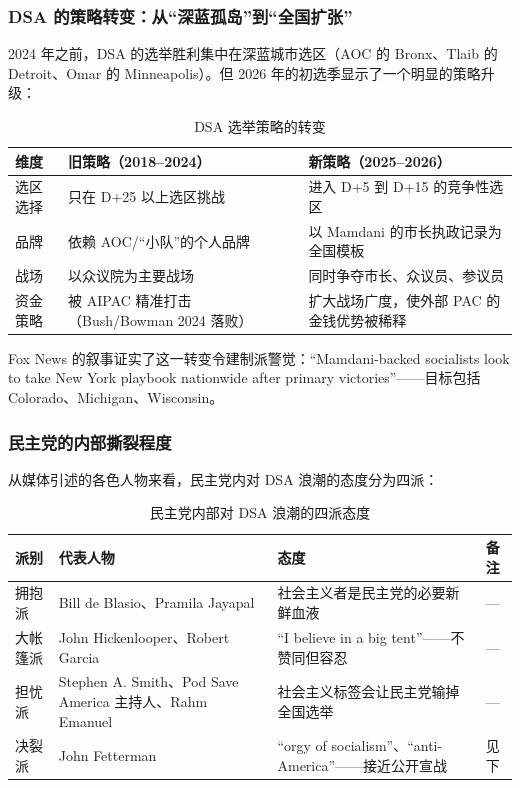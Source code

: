 \documentclass[12pt,a4paper]{ctexart}
\begin{document}
\subsubsection{DSA 的策略转变：从``深蓝孤岛''到``全国扩张''}

2024 年之前，DSA 的选举胜利集中在深蓝城市选区（AOC 的 Bronx、Tlaib 的 Detroit、Omar 的 Minneapolis）。但 2026 年的初选季显示了一个明显的策略升级：

\begin{table}[h]
\centering
\caption{DSA 选举策略的转变}
\begin{tabular}{@{}lp{6.4cm}p{6.4cm}@{}}
\toprule
\textbf{维度} & \textbf{旧策略（2018--2024）} & \textbf{新策略（2025--2026）} \\
\midrule
选区选择 & 只在 D+25 以上选区挑战 & 进入 D+5 到 D+15 的竞争性选区 \\
品牌 & 依赖 AOC/``小队''的个人品牌 & 以 Mamdani 的市长执政记录为全国模板 \\
战场 & 以众议院为主要战场 & 同时争夺市长、众议员、参议员 \\
资金策略 & 被 AIPAC 精准打击（Bush/Bowman 2024 落败） & 扩大战场广度，使外部 PAC 的金钱优势被稀释 \\
\bottomrule
\end{tabular}
\end{table}

Fox News 的叙事证实了这一转变令建制派警觉：``Mamdani-backed socialists look to take New York playbook nationwide after primary victories''——目标包括 Colorado、Michigan、Wisconsin。

\subsubsection{民主党的内部撕裂程度}

从媒体引述的各色人物来看，民主党内对 DSA 浪潮的态度分为四派：

\begin{table}[h]
\centering
\caption{民主党内部对 DSA 浪潮的四派态度}
\begin{tabular}{@{}lp{4.6cm}p{3.6cm}p{5cm}@{}}
\toprule
\textbf{派别} & \textbf{代表人物} & \textbf{态度} & \textbf{备注} \\
\midrule
拥抱派 & Bill de Blasio、Pramila Jayapal & 社会主义者是民主党的必要新鲜血液 & --- \\
大帐篷派 & John Hickenlooper、Robert Garcia & ``I believe in a big tent''——不赞同但容忍 & --- \\
担忧派 & Stephen A. Smith、Pod Save America 主持人、Rahm Emanuel & 社会主义标签会让民主党输掉全国选举 & --- \\
决裂派 & John Fetterman & ``orgy of socialism''、``anti-America''——接近公开宣战 & 见下 \\
\bottomrule
\end{tabular}
\end{table}
\end{document}
